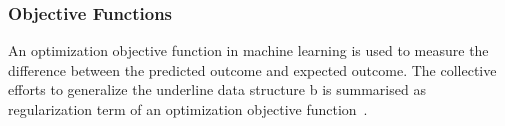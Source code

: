 \subsubsection{Objective Functions}
An optimization objective function in machine learning is used to measure the difference between the predicted outcome and expected outcome. The collective efforts to generalize the underline data structure b is summarised as regularization term of an optimization objective function~\cite{goodfellow_2015}.  